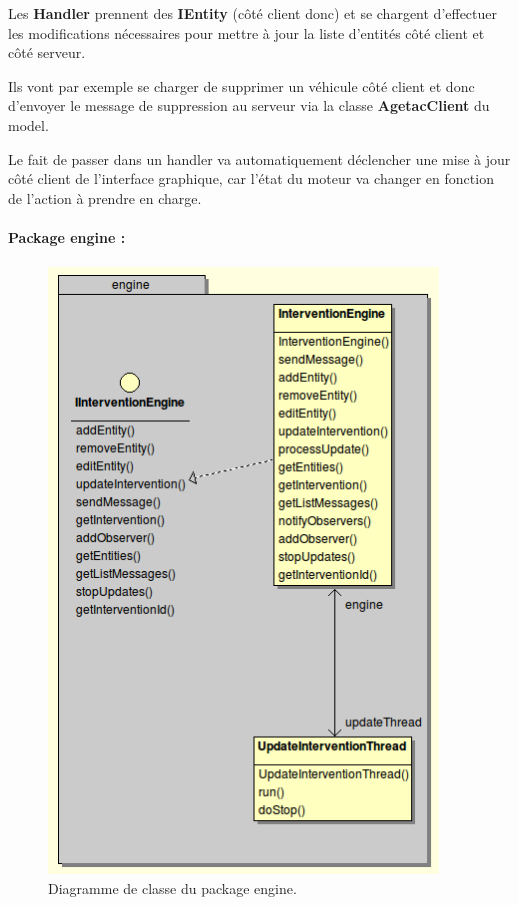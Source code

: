 \documentclass{article}
\begin{document}
Les \textbf{Handler} prennent des \textbf{IEntity} (côté client donc) et se chargent d’effectuer les modifications nécessaires pour mettre à jour la liste d’entités côté client et côté serveur.

Ils vont par exemple se charger de supprimer un véhicule côté client et donc d’envoyer le message de suppression au serveur via la classe \textbf{AgetacClient} du model.

Le fait de passer dans un handler va automatiquement déclencher une mise à jour côté client de l’interface graphique, car l’état du moteur va changer en fonction de l’action à prendre en charge.

\newpage
\paragraph{Package engine :}
\begin{figure}[htbp]
\begin{center}
\includegraphics[width=293pt, height=456pt]{doc_dev-fig008.png}
\caption{Diagramme de classe du package engine.}
\end{center}
\end{figure}
\end{document}
